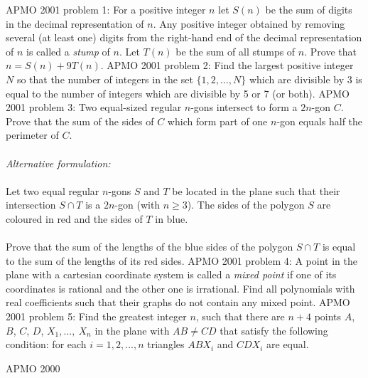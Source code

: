 APMO 2001 problem 1:  For a positive integer $n$ let $S(n)$ be the sum of digits in the decimal representation of $n$.   Any positive integer obtained by removing several (at least one) digits from the right-hand end of the decimal representation of $n$ is called a \textit{stump} of $n$. Let $T(n)$ be the sum of all stumps of $n$. Prove that $n=S(n)+9T(n)$. 
APMO 2001 problem 2:  Find the largest positive integer $N$ so that the number of integers in the set $\{1,2,\dots,N\}$ which are divisible by 3 is equal to the number of integers which are divisible by 5 or 7 (or both). 
APMO 2001 problem 3:  Two equal-sized regular $n$-gons intersect to form a $2n$-gon $C$. Prove that the sum of the sides of $C$ which form part of one $n$-gon equals half the perimeter of $C$. \\\\
\textit{Alternative formulation:} \\\\
Let two equal regular $n$-gons $S$ and $T$ be located in the plane such that their intersection $S\cap T$ is a $2n$-gon (with $n\ge 3$). The sides of the polygon $S$ are coloured in red and the sides of $T$ in blue. \\\\
Prove that the sum of the lengths of the blue sides of the polygon $S\cap T$ is equal to the sum of the lengths of its red sides. 
APMO 2001 problem 4:  A point in the plane with a cartesian coordinate system is called a \textit{mixed  point} if one of its coordinates is rational and the other one is irrational. Find all polynomials with real coefficients such that their graphs do not contain any mixed point. 
APMO 2001 problem 5:  Find the greatest integer $n$, such that there are $n+4$ points $A$, $B$, $C$, $D$, $X_1,\dots,~X_n$ in the plane with $AB\ne CD$ that satisfy the following condition: for each $i=1,2,\dots,n$ triangles $ABX_i$ and $CDX_i$ are equal. 

APMO 2000 

